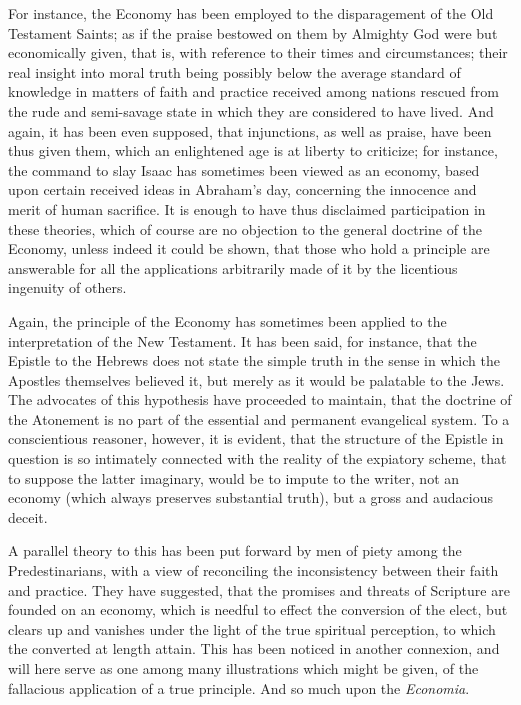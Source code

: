 For instance, the Economy has been employed to the disparagement of
the Old Testament Saints; as if the praise bestowed on them by
Almighty God were but economically given, that is, with reference to
their times and circumstances; their real insight into moral truth
being possibly below the average standard of knowledge in matters of
faith and practice received among nations rescued from the rude and
semi-savage state in which they are considered to have lived. And
again, it has been even supposed, that injunctions, as well as praise,
have been thus given them, which an enlightened age is at liberty
to criticize; for instance, the command to slay Isaac has sometimes
been viewed as an economy, based upon certain received ideas in
Abraham's day, concerning the innocence and merit of human sacrifice.
It is enough to have thus disclaimed participation in these theories,
which of course are no objection to the general doctrine of the
Economy, unless indeed it could be shown, that those who hold a
principle are answerable for all the applications arbitrarily made of
it by the licentious ingenuity of others.

Again, the principle of the Economy has sometimes been applied to
the interpretation of the New Testament. It has been said, for
instance, that the Epistle to the Hebrews does not state the simple
truth in the sense in which the Apostles themselves believed it, but
merely as it would be palatable to the Jews. The advocates of this
hypothesis have proceeded to maintain, that the doctrine of the
Atonement is no part of the essential and permanent evangelical
system. To a conscientious reasoner, however, it is evident, that the
structure of the Epistle in question is so intimately connected with
the reality of the expiatory scheme, that to suppose the latter
imaginary, would be to impute to the writer, not an economy (which
always preserves substantial truth), but a gross and audacious deceit.

A parallel theory to this has been put forward by men of piety
among the Predestinarians, with a view of reconciling the
inconsistency between their faith and practice. They have suggested,
that the promises and threats of Scripture are founded on an economy,
which is needful to effect the conversion of the elect, but clears up and vanishes under the light of the true spiritual
perception, to which the converted at length attain. This has been
noticed in another connexion, and will here serve as one among many
illustrations which might be given, of the fallacious application of a
true principle. And so much upon the \emph{Economia}.

